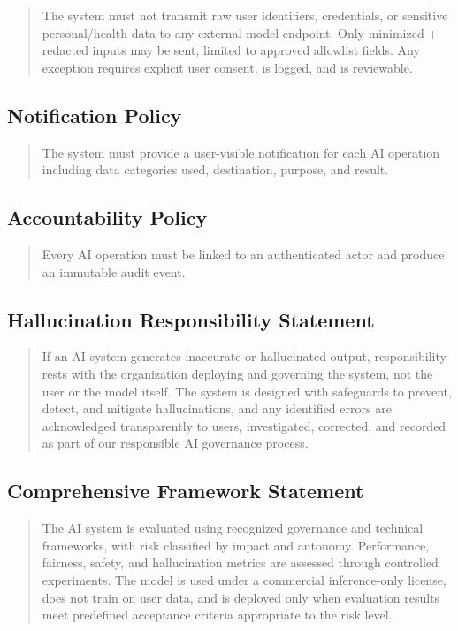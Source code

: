 \begin{quote}
The system must not transmit raw user identifiers, credentials, or sensitive personal/health data to any external model endpoint. Only minimized + redacted inputs may be sent, limited to approved allowlist fields. Any exception requires explicit user consent, is logged, and is reviewable.
\end{quote}

\subsection{Notification Policy}

\begin{quote}
The system must provide a user-visible notification for each AI operation including data categories used, destination, purpose, and result.
\end{quote}

\subsection{Accountability Policy}

\begin{quote}
Every AI operation must be linked to an authenticated actor and produce an immutable audit event.
\end{quote}

\subsection{Hallucination Responsibility Statement}

\begin{quote}
If an AI system generates inaccurate or hallucinated output, responsibility rests with the organization deploying and governing the system, not the user or the model itself. The system is designed with safeguards to prevent, detect, and mitigate hallucinations, and any identified errors are acknowledged transparently to users, investigated, corrected, and recorded as part of our responsible AI governance process.
\end{quote}

\subsection{Comprehensive Framework Statement}

\begin{quote}
The AI system is evaluated using recognized governance and technical frameworks, with risk classified by impact and autonomy. Performance, fairness, safety, and hallucination metrics are assessed through controlled experiments. The model is used under a commercial inference-only license, does not train on user data, and is deployed only when evaluation results meet predefined acceptance criteria appropriate to the risk level.
\end{quote}

